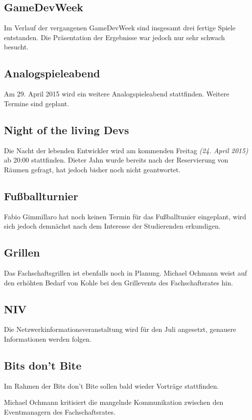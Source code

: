 \documentclass[a4paper, 11pt]{article} %
\begin{document}
\subsection{GameDevWeek}
Im Verlauf der vergangenen GameDevWeek sind insgesamt drei fertige Spiele entstanden. Die Präsentation der Ergebnisse war jedoch nur sehr schwach besucht.

\subsection{Analogspieleabend}
Am 29. April 2015 wird ein weitere Analogspieleabend stattfinden. Weitere Termine sind geplant.

\subsection{Night of the living Devs}
Die Nacht der lebenden Entwickler wird am kommenden Freitag \textit{(24. April 2015)} ab 20:00 stattfinden. Dieter Jahn wurde bereits nach der Reservierung von Räumen gefragt, hat jedoch bisher noch nicht geantwortet.

\subsection{Fußballturnier}
Fabio Gimmillaro hat noch keinen Termin für das Fußballtunier eingeplant, wird sich jedoch demnächst nach dem Interesse der Studierenden erkundigen.

\subsection{Grillen}
Das Fachschaftsgrillen ist ebenfalls noch in Planung. Michael Ochmann weist auf den erhöhten Bedarf von Kohle bei den Grillevents des Fachschaftsrates hin.

\subsection{NIV}
Die Netzwerkinformationsveranstaltung wird für den Juli angesetzt, genauere Informationen werden folgen.

\subsection{Bits don't Bite}
Im Rahmen der Bits don't Bite sollen bald wieder Vorträge stattfinden.\\
\begin{flushleft}
	Michael Ochmann kritisiert die mangelnde Kommunikation zwischen den Eventmanagern des Fachschaftsrates.
\end{flushleft}
\end{document}
